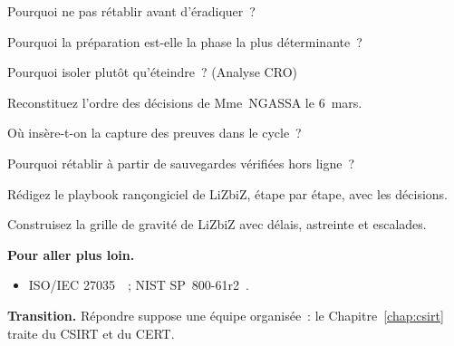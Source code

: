 \begin{boxexo}[title={\ding{45}\quad Exercice~15.3. Ordre \niveaubase}]
Pourquoi ne pas rétablir avant d'éradiquer~?
\end{boxexo}

\begin{boxexo}[title={\ding{45}\quad Exercice~15.4. Préparation \niveaumoyen}]
Pourquoi la préparation est-elle la phase la plus déterminante~?
\end{boxexo}

\begin{boxexo}[title={\ding{45}\quad Exercice~15.5. Isoler \niveaumoyen}]
Pourquoi isoler plutôt qu'éteindre~? (Analyse CRO)
\end{boxexo}

\begin{boxexo}[title={\ding{45}\quad Exercice~15.6. MAYO \niveaumoyen}]
Reconstituez l'ordre des décisions de Mme~NGASSA le 6~mars.
\end{boxexo}

\begin{boxexo}[title={\ding{45}\quad Exercice~15.7. Figer \niveaumoyen}]
Où insère-t-on la capture des preuves dans le cycle~?
\end{boxexo}

\begin{boxexo}[title={\ding{45}\quad Exercice~15.8. Sauvegardes \niveaumoyen}]
Pourquoi rétablir à partir de sauvegardes vérifiées hors ligne~?
\end{boxexo}

\begin{boxexo}[title={\ding{45}\quad Exercice~15.9. Playbook \niveauexpert}]
Rédigez le playbook rançongiciel de LiZbiZ, étape par étape, avec les
décisions.
\end{boxexo}

\begin{boxexo}[title={\ding{45}\quad Exercice~15.10. Grille \niveauexpert}]
Construisez la grille de gravité de LiZbiZ avec délais, astreinte et
escalades.
\end{boxexo}

\bigskip

\begin{boxinfo}
\textbf{Pour aller plus loin.}
\begin{itemize}
    \item ISO/IEC 27035~\cite{iso27035}~; NIST SP~800-61r2~\cite{nist80061r2}.
\end{itemize}
\end{boxinfo}

\begin{boxinfo}
\textbf{Transition.} Répondre suppose une équipe organisée~: le
Chapitre~\ref{chap:csirt} traite du CSIRT et du CERT.
\end{boxinfo}
